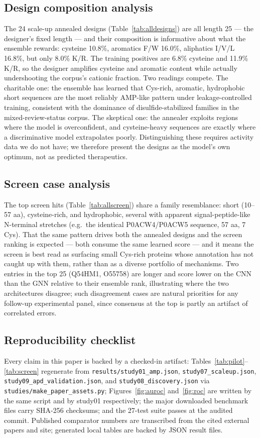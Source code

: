 \subsection{Design composition analysis}
The 24 scale-up annealed designs (Table~\ref{tab:alldesigns}) are all length
25 --- the designer's fixed length --- and their composition is informative
about what the ensemble rewards: cysteine 10.8\%, aromatics F/W 16.0\%,
aliphatics I/V/L 16.8\%, but only 8.0\% K/R. The training positives are 6.8\%
cysteine and 11.9\% K/R, so the designer amplifies cysteine and aromatic
content while actually undershooting the corpus's cationic fraction. Two
readings compete. The charitable one: the ensemble has learned that
Cys-rich, aromatic, hydrophobic short sequences are the most reliably
AMP-like pattern under leakage-controlled training, consistent with the
dominance of disulfide-stabilized families in the mixed-review-status corpus. The
skeptical one: the annealer exploits regions where the model is
overconfident, and cysteine-heavy sequences are exactly where a discriminative
model extrapolates poorly. Distinguishing these requires activity data we do
not have; we therefore present the designs as the model's own optimum, not as
predicted therapeutics.

\subsection{Screen case analysis}
The top screen hits (Table~\ref{tab:allscreen}) share a family resemblance:
short (10--57 aa), cysteine-rich, and hydrophobic, several with apparent
signal-peptide-like N-terminal stretches (e.g.\ the identical P0ACW4/P0ACW5
sequence, 57 aa, 7 Cys). That the same pattern drives both the annealed
designs and the screen ranking is expected --- both consume the same learned
score --- and it means the screen is best read as surfacing small Cys-rich
proteins whose annotation has not caught up with them, rather than as a
diverse portfolio of mechanisms. Two entries in the top 25 (Q54HM1, O55758)
are longer and score lower on the CNN than the GNN relative to their ensemble
rank, illustrating where the two architectures disagree; such disagreement
cases are natural priorities for any follow-up experimental panel, since
consensus at the top is partly an artifact of correlated errors.

\subsection{Reproducibility checklist}
Every claim in this paper is backed by a checked-in artifact:
Tables~\ref{tab:pilot}--\ref{tab:screen} regenerate from
\texttt{results/study01\_amp.json}, \texttt{study07\_scaleup.json},
\texttt{study09\_apd\_validation.json}, and \texttt{study08\_discovery.json}
via \texttt{studies/make\_paper\_assets.py}; Figures~\ref{fig:auroc}
and~\ref{fig:roc} are written by the same script and by study01 respectively;
the major downloaded benchmark files carry SHA-256 checksums; and the 27-test suite passes at the audited commit. Published comparator
numbers are transcribed from the cited external papers and site; generated
local tables are backed by JSON result files.
